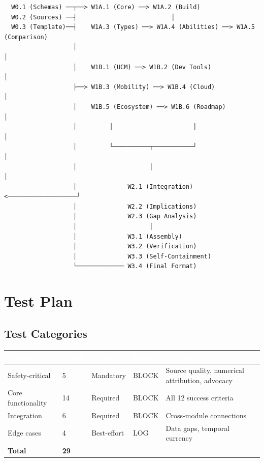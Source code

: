 \documentclass[11pt,letterpaper]{article}
\newcommand{\tableheader}[1]{\textbf{\sffamily\textcolor{white}{#1}}}
\begin{document}
\begin{asciibox}
\begin{verbatim}
  W0.1 (Schemas) ──┬──> W1A.1 (Core) ──> W1A.2 (Build)
  W0.2 (Sources) ──┤                          │
  W0.3 (Template)──┤    W1A.3 (Types) ──> W1A.4 (Abilities) ──> W1A.5 (Comparison)
                   │                                                     │
                   │    W1B.1 (UCM) ──> W1B.2 (Dev Tools)              │
                   ├──> W1B.3 (Mobility) ──> W1B.4 (Cloud)             │
                   │    W1B.5 (Ecosystem) ──> W1B.6 (Roadmap)          │
                   │         │                      │                    │
                   │         └──────────┬───────────┘                    │
                   │                    │                                │
                   │              W2.1 (Integration) <───────────────────┘
                   │              W2.2 (Implications)
                   │              W2.3 (Gap Analysis)
                   │                    │
                   │              W3.1 (Assembly)
                   │              W3.2 (Verification)
                   │              W3.3 (Self-Containment)
                   └───────────── W3.4 (Final Format)
\end{verbatim}
\end{asciibox}

\section{Test Plan}

\subsection{Test Categories}

\begin{center}
\begin{tabularx}{\textwidth}{L{2.5cm}C{1.5cm}C{1.5cm}C{2cm}X}
\toprule
{}
\tableheader{Category} & \tableheader{Count} & \tableheader{Priority} & \tableheader{Failure} & \tableheader{Coverage} \\
\midrule
Safety-critical & 5 & Mandatory & BLOCK & Source quality, numerical attribution, advocacy \\
Core functionality & 14 & Required & BLOCK & All 12 success criteria \\
Integration & 6 & Required & BLOCK & Cross-module connections \\
Edge cases & 4 & Best-effort & LOG & Data gaps, temporal currency \\
\midrule
\textbf{Total} & \textbf{29} & & & \\
\bottomrule
\end{tabularx}
\end{center}
\end{document}
